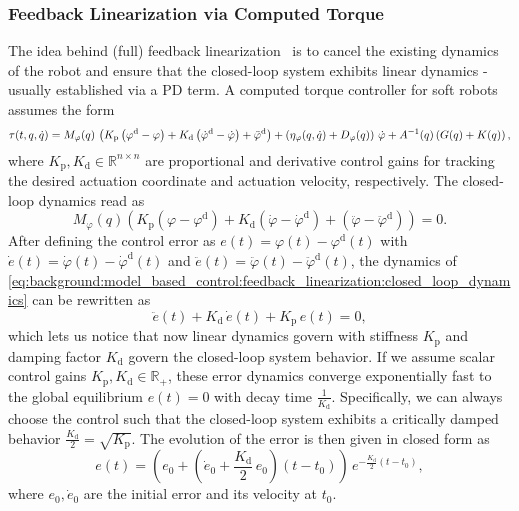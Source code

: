 \subsubsection{Feedback Linearization via Computed Torque}
The idea behind (full) feedback linearization~\citep{slotine1987on, spong2020robot} is to 
cancel the existing dynamics of the robot and ensure that the closed-loop system exhibits linear dynamics - usually established via a PD term. A computed torque controller for soft robots assumes the form
\begin{equation}\small
    \tau(t,q,\dot{q}) = M_{\varphi}(q) \, \left (K_\mathrm{p} \left (\varphi^\mathrm{d} - \varphi \right ) + K_\mathrm{d} \left (\dot{\varphi}^\mathrm{d} - \dot{\varphi} \right ) + \ddot{\varphi}^\mathrm{d}\right ) + \left ( \eta_{\varphi}(q,\dot{q}) + D_\varphi(q) \right ) \, \dot{\varphi} + A^{-1}(q) \left ( G(q) + K(q) \right ),
\end{equation}
where $K_\mathrm{p}, K_\mathrm{d} \in \mathbb{R}^{n \times n}$ are proportional and derivative control gains for tracking the desired actuation coordinate and actuation velocity, respectively. 
The closed-loop dynamics read as
\begin{equation}\label{eq:background:model_based_control:feedback_linearization:closed_loop_dynamics}
    M_{\varphi}(q) \left (K_\mathrm{p} \left (\varphi - \varphi^\mathrm{d} \right ) + K_\mathrm{d} \left (\dot{\varphi} - \dot{\varphi}^\mathrm{d} \right ) + \left ( \ddot{\varphi} - \ddot{\varphi}^\mathrm{d} \right ) \right ) = 0.
\end{equation}
After defining the control error as $e(t) = \varphi(t) - \varphi^\mathrm{d}(t)$ with $\dot{e}(t) = \dot{\varphi}(t) - \dot{\varphi}^\mathrm{d}(t)$ and $\ddot{e}(t) = \ddot{\varphi}(t) - \ddot{\varphi}^\mathrm{d}(t)$, the dynamics of \eqref{eq:background:model_based_control:feedback_linearization:closed_loop_dynamics} can be rewritten as
\begin{equation}
    \ddot{e}(t) + K_\mathrm{d} \, \dot{e}(t) + K_\mathrm{p} \, e(t) = 0,
\end{equation}
which lets us notice that now linear dynamics govern with stiffness $K_\mathrm{p}$ and damping factor $K_\mathrm{d}$ govern the closed-loop system behavior.
If we assume scalar control gains $K_\mathrm{p}, K_\mathrm{d} \in \mathbb{R}_+$, these error dynamics converge exponentially fast to the global equilibrium $e(t) = 0$ with decay time $\frac{1}{K_\mathrm{d}}$. Specifically, we can always choose the control such that the closed-loop system exhibits a critically damped behavior $\frac{K_\mathrm{d}}{2} = \sqrt{K_\mathrm{p}}$.
The evolution of the error is then given in closed form as
\begin{equation}\label{eq:background:model_based_control:feedback_linearization:error_evolution_closed_form}
    e(t) = \left ( e_0 + \left ( \dot{e}_0 + \frac{K_\mathrm{d}}{2} \, e_0 \right ) (t-t_0) \right ) \, e^{-\frac{K_\mathrm{d}}{2} (t - t_0)},
\end{equation}
where $e_0, \dot{e}_0$ are the initial error and its velocity at $t_0$.

